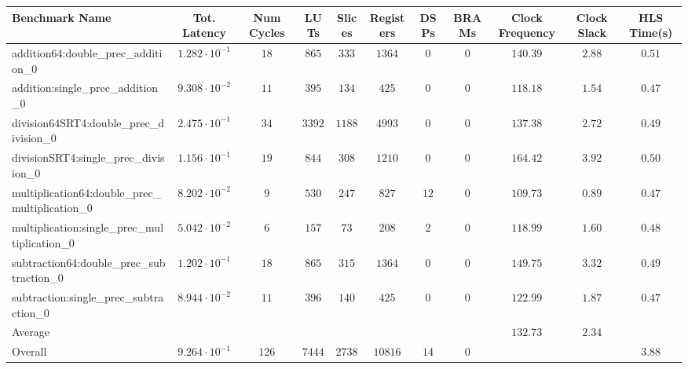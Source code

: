 \begin{tabular}{|l|c|c|c|c|c|c|c|c|c|c|}
\hline
Benchmark Name                                   & Tot. Latency            & Num Cycles & LUTs     & Slices   & Registers & DSPs   & BRAMs & Clock Frequency & Clock Slack & HLS Time(s) \\
\hline
addition64:double\_prec\_addition\_0             & $ 1.282 \cdot 10^{-1} $ & $ 18     $ & $ 865  $ & $ 333  $ & $ 1364  $ & $ 0  $ & $ 0 $ & $ 140.39      $ & $ 2.88    $ & $ 0.51    $ \\
addition:single\_prec\_addition\_0               & $ 9.308 \cdot 10^{-2} $ & $ 11     $ & $ 395  $ & $ 134  $ & $ 425   $ & $ 0  $ & $ 0 $ & $ 118.18      $ & $ 1.54    $ & $ 0.47    $ \\
division64SRT4:double\_prec\_division\_0         & $ 2.475 \cdot 10^{-1} $ & $ 34     $ & $ 3392 $ & $ 1188 $ & $ 4993  $ & $ 0  $ & $ 0 $ & $ 137.38      $ & $ 2.72    $ & $ 0.49    $ \\
divisionSRT4:single\_prec\_division\_0           & $ 1.156 \cdot 10^{-1} $ & $ 19     $ & $ 844  $ & $ 308  $ & $ 1210  $ & $ 0  $ & $ 0 $ & $ 164.42      $ & $ 3.92    $ & $ 0.50    $ \\
multiplication64:double\_prec\_multiplication\_0 & $ 8.202 \cdot 10^{-2} $ & $ 9      $ & $ 530  $ & $ 247  $ & $ 827   $ & $ 12 $ & $ 0 $ & $ 109.73      $ & $ 0.89    $ & $ 0.47    $ \\
multiplication:single\_prec\_multiplication\_0   & $ 5.042 \cdot 10^{-2} $ & $ 6      $ & $ 157  $ & $ 73   $ & $ 208   $ & $ 2  $ & $ 0 $ & $ 118.99      $ & $ 1.60    $ & $ 0.48    $ \\
subtraction64:double\_prec\_subtraction\_0       & $ 1.202 \cdot 10^{-1} $ & $ 18     $ & $ 865  $ & $ 315  $ & $ 1364  $ & $ 0  $ & $ 0 $ & $ 149.75      $ & $ 3.32    $ & $ 0.49    $ \\
subtraction:single\_prec\_subtraction\_0         & $ 8.944 \cdot 10^{-2} $ & $ 11     $ & $ 396  $ & $ 140  $ & $ 425   $ & $ 0  $ & $ 0 $ & $ 122.99      $ & $ 1.87    $ & $ 0.47    $ \\
\hline
Average                                          & $                     $ & $        $ & $      $ & $      $ & $       $ & $    $ & $   $ & $ 132.73      $ & $ 2.34    $ & $         $ \\
\hline
Overall                                          & $ 9.264 \cdot 10^{-1} $ & $ 126    $ & $ 7444 $ & $ 2738 $ & $ 10816 $ & $ 14 $ & $ 0 $ & $             $ & $         $ & $ 3.88    $ \\
\hline
\end{tabular}
